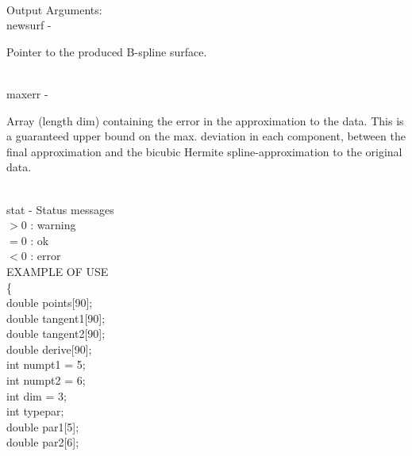 \\
        \>Output Arguments:\\
        \>\>    {\fov newsurf}\> - \>   \begin{minipg2}
                                Pointer to the produced B-spline surface.
                                \end{minipg2}\\
        \>\>    {\fov maxerr}\> - \>    \begin{minipg2}
                                Array (length dim)
                                containing the error in the approximation to the data.
                                This is a guaranteed upper bound on the max. deviation
                                in each component, between the final approximation
                                and the bicubic Hermite spline-approximation to the original data.

                                \end{minipg2}\\[0.3ex]
        \>\>    {\fov stat}     \> - \> Status messages\\
                \>\>\>\>\>              $> 0$   : warning\\
                \>\>\>\>\>              $= 0$   : ok\\
                \>\>\>\>\>              $< 0$   : error\\
\newpagetabs
EXAMPLE OF USE\\
                \>      \{ \\
                \>\>    double  \>      {\fov points}[90];\\
                \>\>    double  \>      {\fov tangent1}[90];\\
                \>\>    double  \>      {\fov tangent2}[90];\\
                \>\>    double  \>      {\fov derive}[90];\\
                \>\>    int     \>      {\fov numpt1} = 5;\\
                \>\>    int     \>      {\fov numpt2} = 6;\\
                \>\>    int     \>      {\fov dim} = 3;\\
                \>\>    int     \>      {\fov typepar};\\
                \>\>    double  \>      {\fov par1}[5];\\
                \>\>    double  \>      {\fov par2}[6];\\

